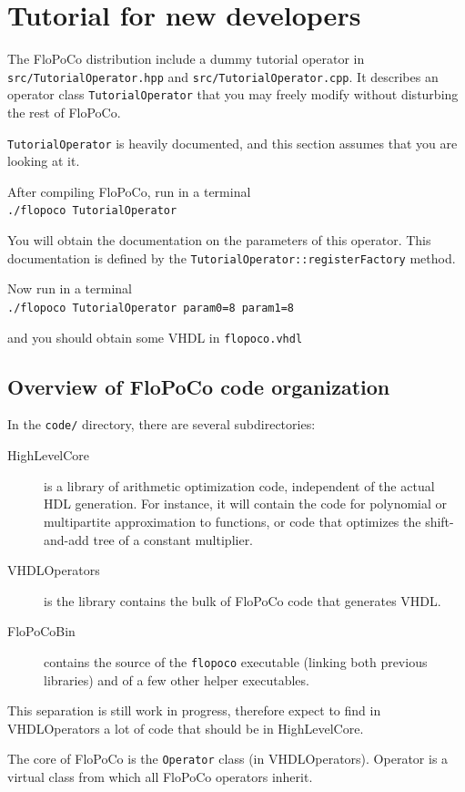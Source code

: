 \documentclass{article}
\begin{document}
\section{Tutorial for new developers \label{sec:tutorial}}

The FloPoCo distribution include a dummy tutorial operator in \texttt{src/TutorialOperator.hpp} and \texttt{src/TutorialOperator.cpp}.
It describes an operator class \texttt{TutorialOperator} that you may freely modify without disturbing the rest of FloPoCo.

\texttt{TutorialOperator} is heavily documented, and this section assumes that you are looking at it.

After compiling FloPoCo, run in a terminal\\
\verb!./flopoco TutorialOperator!

You will obtain the documentation on the parameters of this operator.
This documentation is defined by the \texttt{TutorialOperator::registerFactory} method.

Now run in a terminal\\
\verb!./flopoco TutorialOperator param0=8 param1=8!

and you should obtain  some VHDL in \texttt{flopoco.vhdl}

\subsection{Overview of FloPoCo code organization}

In the \texttt{code/} directory, there are several subdirectories:
\begin{description}
\item[HighLevelCore] is a library of arithmetic optimization code, independent of the actual HDL generation. For instance, it will contain the code for polynomial or multipartite approximation to functions, or code that optimizes the shift-and-add tree of a constant multiplier.   
\item[VHDLOperators] is the library contains the bulk of FloPoCo code that generates VHDL. 
\item[FloPoCoBin] contains the source of the \texttt{flopoco} executable (linking both previous libraries) and of a few other helper executables.
\end{description}
This separation is still work in progress, therefore expect to find in VHDLOperators a lot of code that should be in HighLevelCore.

The core of FloPoCo is the \texttt{Operator} class  (in VHDLOperators). 
Operator is a virtual class from which all FloPoCo operators inherit. 
\end{document}
